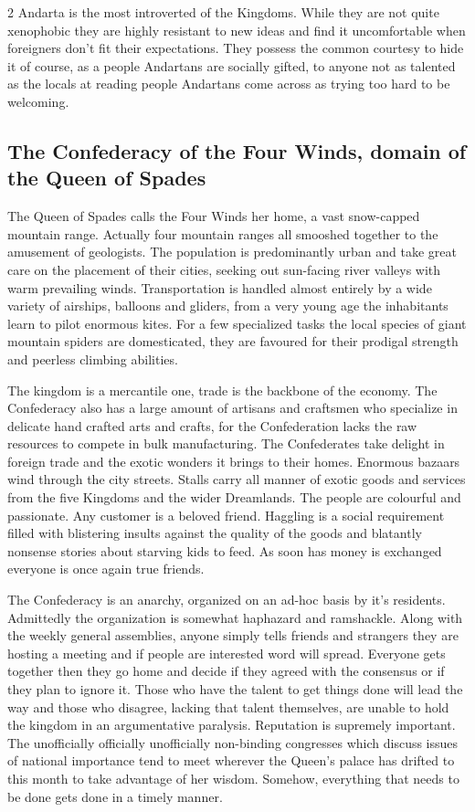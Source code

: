 \begin{multicols}{2}
Andarta is the most introverted of the Kingdoms. While they are not quite xenophobic they are highly resistant to new ideas and find it uncomfortable when foreigners don't fit their expectations. They possess the common courtesy to hide it of course, as a people Andartans are socially gifted, to anyone not as talented as the locals at reading people Andartans come across as trying too hard to be welcoming. 

\subsection*{The Confederacy of the Four Winds, domain of the Queen of Spades}

The Queen of Spades calls the Four Winds her home, a vast snow-capped mountain range. Actually four mountain ranges all smooshed together to the amusement of geologists. The population is predominantly urban and take great care on the placement of their cities, seeking out sun-facing river valleys with warm prevailing winds. Transportation is handled almost entirely by a wide variety of airships, balloons and gliders, from a very young age the inhabitants learn to pilot enormous kites. For a few specialized tasks the local species of giant mountain spiders are domesticated, they are favoured for their prodigal strength and peerless climbing abilities.

The kingdom is a mercantile one, trade is the backbone of the economy. The Confederacy also has a large amount of artisans and craftsmen who specialize in delicate hand crafted arts and crafts, for the Confederation lacks the raw resources to compete in bulk manufacturing. The Confederates take delight in foreign trade and the exotic wonders it brings to their homes. Enormous bazaars wind through the city streets. Stalls carry all manner of exotic goods and services from the five Kingdoms and the wider Dreamlands. The people are colourful and passionate. Any customer is a beloved friend. Haggling is a social requirement filled with blistering insults against the quality of the goods and blatantly nonsense stories about starving kids to feed. As soon has money is exchanged everyone is once again true friends.

The Confederacy is an anarchy, organized on an ad-hoc basis by it's residents. Admittedly the organization is somewhat haphazard and ramshackle. Along with the weekly general assemblies, anyone simply tells friends and strangers they are hosting a meeting and if people are interested word will spread. Everyone gets together then they go home and decide if they agreed with the consensus or if they plan to ignore it. Those who have the talent to get things done will lead the way and those who disagree, lacking that talent themselves, are unable to hold the kingdom in an argumentative paralysis. Reputation is supremely important. The unofficially officially unofficially non-binding congresses which discuss issues of national importance tend to meet wherever the Queen's palace has drifted to this month to take advantage of her wisdom. Somehow, everything that needs to be done gets done in a timely manner.


\end{multicols}
